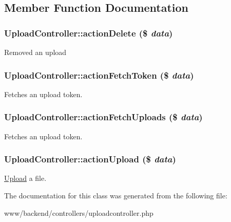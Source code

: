 \subsection{Member Function Documentation}
\hypertarget{classUploadController_a107d052c524ffab7de8adb67f296a5f9}{
\subsubsection[{actionDelete}]{\setlength{\rightskip}{0pt plus 5cm}UploadController::actionDelete (\$ {\em data})}}
\label{classUploadController_a107d052c524ffab7de8adb67f296a5f9}
Removed an upload \hypertarget{classUploadController_a4fa1e1e4e97f965fdcd852b0d53721bb}{
\subsubsection[{actionFetchToken}]{\setlength{\rightskip}{0pt plus 5cm}UploadController::actionFetchToken (\$ {\em data})}}
\label{classUploadController_a4fa1e1e4e97f965fdcd852b0d53721bb}
Fetches an upload token. \hypertarget{classUploadController_a65ec284e6637e13969f2c86ca17577d4}{
\subsubsection[{actionFetchUploads}]{\setlength{\rightskip}{0pt plus 5cm}UploadController::actionFetchUploads (\$ {\em data})}}
\label{classUploadController_a65ec284e6637e13969f2c86ca17577d4}
Fetches an upload token. \hypertarget{classUploadController_a24a9ee619055e570ba66193ec2b378b1}{
\subsubsection[{actionUpload}]{\setlength{\rightskip}{0pt plus 5cm}UploadController::actionUpload (\$ {\em data})}}
\label{classUploadController_a24a9ee619055e570ba66193ec2b378b1}
\hyperlink{classUpload}{Upload} a file. 

The documentation for this class was generated from the following file:\begin{DoxyCompactItemize}
\item 
www/backend/controllers/uploadcontroller.php\end{DoxyCompactItemize}
